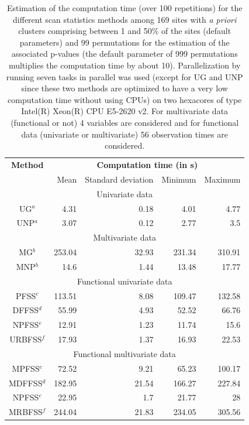 \begin{table}[htbp]
\centering
\caption{Estimation of the computation time (over 100 repetitions) for the different scan statistics methods among 169 sites with \textit{a priori} clusters comprising between 1 and 50\% of the sites (default parameters) and 99 permutations for the estimation of the associated p-values (the default parameter of 999 permutations multiplies the computation time by about 10). Parallelization by running seven tasks in parallel was used (except for UG and UNP since these two methods are optimized to have a very low computation time without using CPUs) on two hexacores of type Intel(R) Xeon(R) CPU E5-2620 v2. For multivariate data (functional or not) 4 variables are considered and for functional data (univariate or multivariate) 56 observation times are considered.}
\begin{scriptsize}
\begin{tabular}{crrrr}
\toprule
\textbf{Method} & \multicolumn{4}{c}{\textbf{Computation time (in s)}} \\
& Mean & Standard deviation & Minimum & Maximum \\
\midrule
\midrule
\multicolumn{5}{c}{Univariate data} \\
\midrule
UG$^a$ & 4.31 & 0.18 & 4.01 & 4.77  \\
UNP$^a$ & 3.07 & 0.12 & 2.77 & 3.5 \\
\midrule
\midrule
\multicolumn{5}{c}{Multivariate data} \\
\midrule
MG$^b$ & 253.04 & 32.93 & 231.34 & 310.91 \\
MNP$^b$ & 14.6 & 1.44 & 13.48 & 17.77 
\\
\midrule
\midrule
\multicolumn{5}{c}{Functional univariate data} \\
\midrule
PFSS$^c$ & 113.51 & 8.08 & 109.47 & 132.58 \\ 
DFFSS$^d$ & 55.99 & 4.93 & 52.52 & 66.76 \\
NPFSS$^e$ & 12.91 & 1.23 & 11.74 & 15.6 \\
URBFSS$^f$ & 17.93 & 1.37 & 16.93 & 22.53 \\
\midrule
\midrule
\multicolumn{5}{c}{Functional multivariate data} \\
\midrule
MPFSS$^c$ & 72.52 & 9.21 & 65.23 & 100.17 \\
MDFFSS$^d$ & 182.95 & 21.54 & 166.27 & 227.84 \\
NPFSS$^e$ & 22.95 & 1.7 & 21.77 & 28 \\
MRBFSS$^f$ & 244.04 & 21.83 & 234.05 & 305.56 \\
\bottomrule
\end{tabular}


\end{scriptsize}
\end{table}
